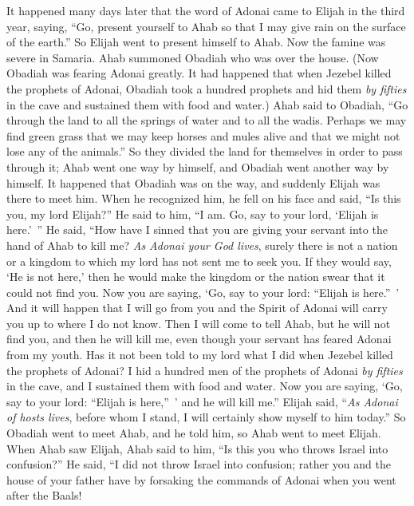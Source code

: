 \begin{biblechapter} %
 It happened many days later that the word of Adonai came to Elijah in the third year, saying, “Go, present yourself to Ahab so that I may give rain on the surface of the earth.”
\verse So Elijah went to present himself to Ahab. Now the famine was severe in Samaria.
\verse Ahab summoned Obadiah who was over the house. (Now Obadiah was fearing Adonai greatly.
\verse It had happened that when Jezebel killed the prophets of Adonai, Obadiah took a hundred prophets and hid them \textit{by fifties} in the cave and sustained them with food and water.)
\verse Ahab said to Obadiah, “Go through the land to all the springs of water and to all the wadis. Perhaps we may find green grass that we may keep horses and mules alive and that we might not lose any of the animals.”
\verse So they divided the land for themselves in order to pass through it; Ahab went one way by himself, and Obadiah went another way by himself.
\verse It happened that Obadiah was on the way, and suddenly Elijah was there to meet him. When he recognized him, he fell on his face and said, “Is this you, my lord Elijah?”
\verse He said to him, “I am. Go, say to your lord, ‘Elijah is here.’ ”
\verse He said, “How have I sinned that you are giving your servant into the hand of Ahab to kill me?
\verse \textit{As Adonai your God lives}, surely there is not a nation or a kingdom to which my lord has not sent me to seek you. If they would say, ‘He is not here,’ then he would make the kingdom or the nation swear that it could not find you.
\verse Now you are saying, ‘Go, say to your lord: “Elijah is here.” ’
\verse And it will happen that I will go from you and the Spirit of Adonai will carry you up to where I do not know. Then I will come to tell Ahab, but he will not find you, and then he will kill me, even though your servant has feared Adonai from my youth.
\verse Has it not been told to my lord what I did when Jezebel killed the prophets of Adonai? I hid a hundred men of the prophets of Adonai \textit{by fifties} in the cave, and I sustained them with food and water.
\verse Now you are saying, ‘Go, say to your lord: “Elijah is here,” ’ and he will kill me.”
\verse Elijah said, “\textit{As Adonai of hosts lives}, before whom I stand, I will certainly show myself to him today.”
\verse So Obadiah went to meet Ahab, and he told him, so Ahab went to meet Elijah.
\verse When Ahab saw Elijah, Ahab said to him, “Is this you who throws Israel into confusion?”
\verse He said, “I did not throw Israel into confusion; rather you and the house of your father have by forsaking the commands of Adonai when you went after the Baals!

\end{biblechapter}
